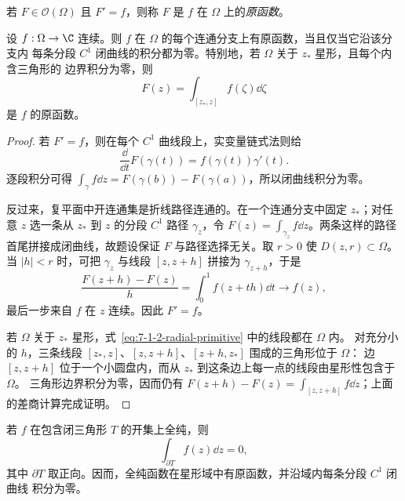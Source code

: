 \begin{definition}[原函数]\label{def:7-1-2-2}
若 $F\in\mathcal O(\Omega)$ 且 $F'=f$，则称 $F$ 是 $f$ 在 $\Omega$ 上的\emph{原函数}。
\end{definition}

\begin{proposition}[原函数与路径无关]\label{proposition:7-1-2-primitive-criterion}
设 $f:\Omega\to\C$ 连续。则 $f$ 在 $\Omega$ 的每个连通分支上有原函数，当且仅当它沿该分支内
每条分段 $C^1$ 闭曲线的积分都为零。特别地，若 $\Omega$ 关于 $z_*$ 星形，且每个内含三角形的
边界积分为零，则
\[
  F(z)=\int_{[z_*,z]}f(\zeta)\dd\zeta
  \tag{7.1.4}\label{eq:7-1-2-radial-primitive}
\]
是 $f$ 的原函数。
\end{proposition}

\begin{proof}
若 $F'=f$，则在每个 $C^1$ 曲线段上，实变量链式法则给
\[
 \frac{\dd}{\dd t}F(\gamma(t))=f(\gamma(t))\gamma'(t).
\]
逐段积分可得 $\int_\gamma f\dd z=F(\gamma(b))-F(\gamma(a))$，所以闭曲线积分为零。

反过来，复平面中开连通集是折线路径连通的。在一个连通分支中固定 $z_*$；对任意 $z$ 选一条从
$z_*$ 到 $z$ 的分段 $C^1$ 路径 $\gamma_z$，令 $F(z)=\int_{\gamma_z}f\dd z$。两条这样的路径
首尾拼接成闭曲线，故题设保证 $F$ 与路径选择无关。取 $r>0$ 使 $D(z,r)\subset\Omega$。当
$|h|<r$ 时，可把 $\gamma_z$ 与线段 $[z,z+h]$ 拼接为 $\gamma_{z+h}$，于是
\[
 \frac{F(z+h)-F(z)}h
 =\int_0^1 f(z+th)\dd t\longrightarrow f(z),
\]
最后一步来自 $f$ 在 $z$ 连续。因此 $F'=f$。

若 $\Omega$ 关于 $z_*$ 星形，式~\eqref{eq:7-1-2-radial-primitive} 中的线段都在 $\Omega$ 内。
对充分小的 $h$，三条线段 $[z_*,z]$、$[z,z+h]$、$[z+h,z_*]$ 围成的三角形位于 $\Omega$：
边 $[z,z+h]$ 位于一个小圆盘内，而从 $z_*$ 到这条边上每一点的线段由星形性包含于 $\Omega$。
三角形边界积分为零，因而仍有
$F(z+h)-F(z)=\int_{[z,z+h]}f\dd z$；上面的差商计算完成证明。
\end{proof}

\begin{theorem}\label{theorem:7-1-2-1}
若 $f$ 在包含闭三角形 $T$ 的开集上全纯，则
\[
  \int_{\partial T}f(z)\dd z=0,
  \tag{7.1.5}\label{eq:7-1-2-goursat-triangle}
\]
其中 $\partial T$ 取正向。因而，全纯函数在星形域中有原函数，并沿域内每条分段 $C^1$ 闭曲线
积分为零。
\end{theorem}


